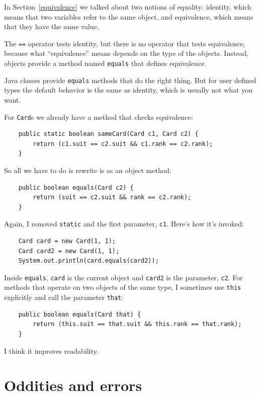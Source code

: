 \documentclass[12pt]{book}
\theoremstyle{exercise}
\begin{document}
In Section~\ref{equivalence} we talked about two notions of equality:
identity, which means that two variables refer to the same
object, and equivalence, which means that they have the same
value.

The {\tt ==} operator tests identity, but there is no operator
that tests equivalence, because what ``equivalence'' means
depends on the type of the objects.  Instead, objects provide
a method named {\tt equals} that defines equivalence.

Java classes provide {\tt equals} methods that do the right
thing.  But for user defined types the default behavior is the
same as identity, which is usually not what you want.

For {\tt Card}s we already have a method that checks equivalence:

\begin{lstlisting}
    public static boolean sameCard(Card c1, Card c2) {
        return (c1.suit == c2.suit && c1.rank == c2.rank);
    }
\end{lstlisting}
%
So all we have to do is rewrite is as an object method:

\begin{lstlisting}
    public boolean equals(Card c2) {
        return (suit == c2.suit && rank == c2.rank);
    }
\end{lstlisting}
%
Again, I removed {\tt static} and the first parameter, {\tt c1}.
Here's how it's invoked:

\begin{lstlisting}
    Card card = new Card(1, 1);
    Card card2 = new Card(1, 1);
    System.out.println(card.equals(card2));
\end{lstlisting}
%
Inside {\tt equals}, {\tt card} is the current object and {\tt card2}
is the parameter, {\tt c2}.  For methods that operate on two objects
of the same type, I sometimes use {\tt this} explicitly and call
the parameter {\tt that}:

\begin{lstlisting}
    public boolean equals(Card that) {
        return (this.suit == that.suit && this.rank == that.rank);
    }
\end{lstlisting}
%
I think it improves readability.


\section{Oddities and errors}
\end{document}
